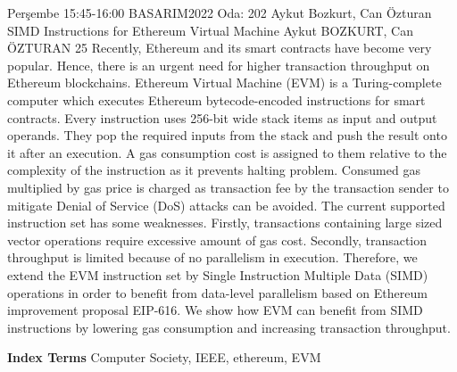 
    \begin{abstract_basarim}
    {Perşembe 15:45-16:00}
    {BASARIM2022}
    {Oda: 202}
    {Aykut Bozkurt, Can Özturan}
    {SIMD Instructions for Ethereum Virtual Machine}
    {%
    Aykut BOZKURT, Can ÖZTURAN}
    {%
    }
    {%
    25}
    Recently, Ethereum and its smart contracts have become very popular. Hence, there is an urgent need for higher transaction throughput on Ethereum blockchains. Ethereum Virtual Machine (EVM) is a Turing-complete computer which executes Ethereum bytecode-encoded instructions for smart contracts. Every instruction uses 256-bit wide stack items as input and output operands. They pop the required inputs from the stack and push the result onto it after an execution. A gas consumption cost is assigned to them relative to the complexity of the instruction as it prevents halting problem. Consumed gas multiplied by gas price is charged as transaction fee by the transaction sender to mitigate Denial of Service (DoS) attacks can be avoided. The current supported instruction set has some weaknesses. Firstly, transactions containing large sized vector operations require excessive amount of gas cost. Secondly, transaction throughput is limited because of no parallelism in execution. Therefore, we extend the EVM instruction set by Single Instruction Multiple Data (SIMD) operations in order to benefit from data-level parallelism based on Ethereum improvement proposal EIP-616. We show how EVM can benefit from SIMD instructions by lowering gas consumption and increasing transaction throughput. 
    
            \textbf{Index Terms} \newline{}Computer Society, IEEE, ethereum, EVM
    \end{abstract_basarim}
    